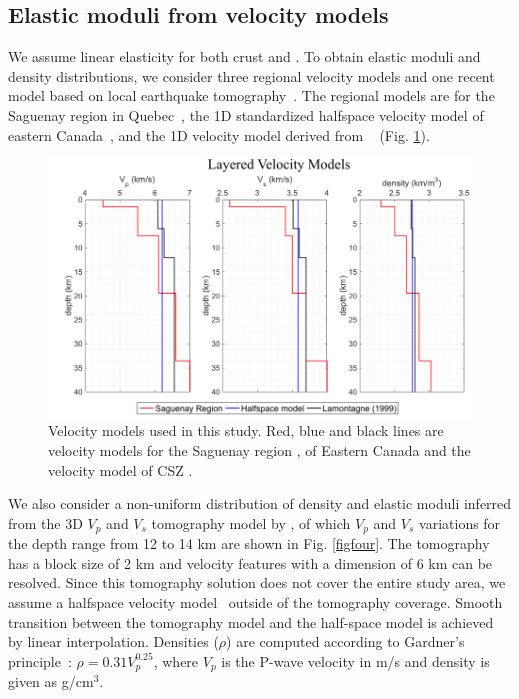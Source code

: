 \documentclass[draft]{agujournal2018}
\begin{document}
\subsection{Elastic moduli from velocity models}
We assume linear elasticity for both crust and . To obtain elastic moduli and density distributions, we consider three regional velocity models and one recent model based on local earthquake tomography~\citep{Powell_2017}. The regional models are for the Saguenay region in Quebec~\citep{Somerville1990}, the 1D standardized halfspace velocity model of eastern Canada~\citep{lamontagne1999}, and the 1D velocity model derived from ~\citep{lamontagne1999} (Fig. \ref{figthree}).

\begin{figure}[ht]
\centering
\includegraphics[width=30pc]{Figures/layered_vel_models.png}
\caption{Velocity models used in this study. Red, blue and black lines are velocity models for the Saguenay region \citep{Somerville1990},  of Eastern Canada \citep{lamontagne1999} and the  velocity model of CSZ \citep{lamontagne1999}.}
\label{figthree}
\end{figure}

We also consider a non-uniform distribution of density and elastic moduli inferred from the 3D $V_p$ and $V_s$ tomography model by \citet{Powell_2017}, of which $V_p$ and $V_s$ variations for the depth range from 12 to 14 km are shown in Fig. \ref{figfour}. The tomography has a block size of 2 km and velocity features with a dimension of 6 km can be resolved. Since this tomography solution does not cover the entire study area, we assume a halfspace velocity model~\citep{lamontagne1999} outside of the tomography coverage. Smooth transition between the tomography model and the half-space model is achieved by linear interpolation. Densities ($\rho$) are computed according to Gardner's principle~\citep{Gardner_1974}: $\rho=0.31 V_p^{0.25}$, where $V_p$ is the P-wave velocity in m/s and density is given as g/cm$^3$.
\end{document}
